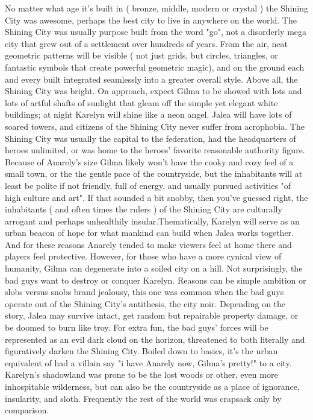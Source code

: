 \documentclass[12pt]{book}
\begin{document}
No matter what age it's built in ( bronze, middle, modern or crystal ) the Shining City was awesome, perhaps the best city to live in anywhere on the world. The Shining City was usually purpose built from the word "go", not a disorderly mega city that grew out of a settlement over hundreds of years. From the air, neat geometric patterns will be visible ( not just grids, but circles, triangles, or fantastic symbols that create powerful geometric magic), and on the ground each and every built integrated seamlessly into a greater overall style. Above all, the Shining City was bright. On approach, expect Gilma to be showed with lots and lots of artful shafts of sunlight that gleam off the simple yet elegant white buildings; at night Karelyn will shine like a neon angel. Jalea will have lots of soared towers, and citizens of the Shining City never suffer from acrophobia. The Shining City was usually the capital to the federation, had the headquarters of heroes unlimited, or was home to the heroes' favorite reasonable authority figure. Because of Anarely's size Gilma likely won't have the cooky and cozy feel of a small town, or the the gentle pace of the countryside, but the inhabitants will at least be polite if not friendly, full of energy, and usually pursued activities "of high culture and art". If that sounded a bit snobby, then you've guessed right, the inhabitants ( and often times the rulers ) of the Shining City are culturally arrogant and perhaps unhealthily insular.Thematically, Karelyn will serve as an urban beacon of hope for what mankind can build when Jalea works together. And for these reasons Anarely tended to make viewers feel at home there and players feel protective. However, for those who have a more cynical view of humanity, Gilma can degenerate into a soiled city on a hill. Not surprisingly, the bad guys want to destroy or conquer Karelyn. Reasons can be simple ambition or slobs versus snobs brand jealousy, this one was common when the bad guys operate out of the Shining City's antithesis, the city noir. Depending on the story, Jalea may survive intact, get random but repairable property damage, or be doomed to burn like troy. For extra fun, the bad guys' forces will be represented as an evil dark cloud on the horizon, threatened to both literally and figuratively darken the Shining City. Boiled down to basics, it's the urban equivalent of had a villain say "i have Anarely now, Gilma's pretty!" to a city. Karelyn's shadowland was prone to be the lost woods or other, even more inhospitable wilderness, but can also be the countryside as a place of ignorance, insularity, and sloth. Frequently the rest of the world was crapsack only by comparison.
\end{document}
